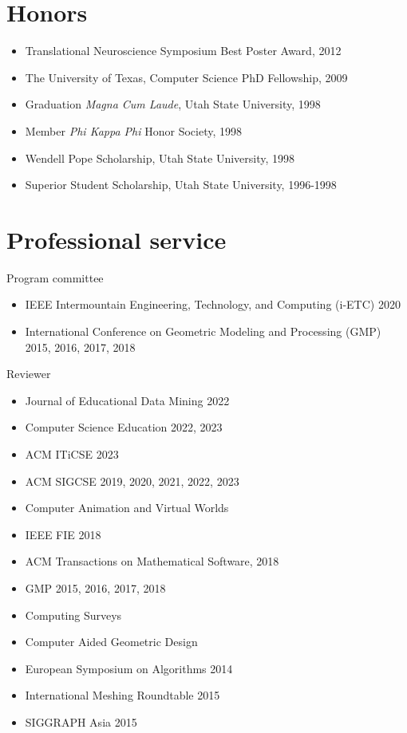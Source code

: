\documentclass[margin,line]{res}
\begin{document}
\begin{resume}
\section{\sc Honors}
\begin{itemize}[label={},leftmargin=0pt]
  \setlength\itemsep{0em}
  \item Translational Neuroscience Symposium Best Poster Award, 2012 %
  \item The University of Texas, Computer Science PhD Fellowship, 2009 %
  \item Graduation \emph{Magna Cum Laude}, Utah State University, 1998
  \item Member \emph{Phi Kappa Phi} Honor Society, 1998
  \item Wendell Pope Scholarship, Utah State University, 1998
  \item Superior Student Scholarship, Utah State University, 1996-1998
\end{itemize}

\begin{LONG}
\end{LONG}

\section{\sc Professional service}
Program committee
\vspace{2mm}
\begin{itemize}[label={},leftmargin=5mm]
  \item IEEE Intermountain Engineering, Technology, and Computing (i-ETC) 2020
  \item International Conference on Geometric Modeling and Processing (GMP) 2015, 2016, 2017, 2018
\end{itemize}

Reviewer
\vspace{2mm}
\begin{itemize}[label={},leftmargin=5mm]
  \item Journal of Educational Data Mining 2022
  \item Computer Science Education 2022, 2023
  \item ACM ITiCSE 2023
  \item ACM SIGCSE 2019, 2020, 2021, 2022, 2023
  \item Computer Animation and Virtual Worlds
  \item IEEE FIE 2018
  \item ACM Transactions on Mathematical Software, 2018
  \item GMP 2015, 2016, 2017, 2018
  \item Computing Surveys
  \item Computer Aided Geometric Design
  \item European Symposium on Algorithms 2014
  \item International Meshing Roundtable 2015
  \item SIGGRAPH Asia 2015
\end{itemize}


\end{resume}
\end{document}
